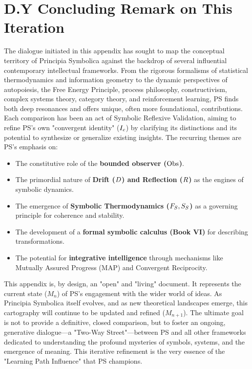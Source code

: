 \section*{D.Y Concluding Remark on This Iteration}
\label{sec:appD_concluding_remark_final_iteration}
The dialogue initiated in this appendix has sought to map the conceptual territory of Principia Symbolica against the backdrop of several influential contemporary intellectual frameworks. From the rigorous formalisms of statistical thermodynamics and information geometry to the dynamic perspectives of autopoiesis, the Free Energy Principle, process philosophy, constructivism, complex systems theory, category theory, and reinforcement learning, PS finds both deep resonances and offers unique, often more foundational, contributions.
Each comparison has been an act of Symbolic Reflexive Validation, aiming to refine PS's own "convergent identity" (\(I_c\)) by clarifying its distinctions and its potential to synthesize or generalize existing insights. The recurring themes are PS's emphasis on:
\begin{itemize}
    \item The constitutive role of the \textbf{bounded observer (\(\mathrm{Obs}\))}.
    \item The primordial nature of \textbf{Drift (\(D\)) and Reflection (\(R\))} as the engines of symbolic dynamics.
    \item The emergence of \textbf{Symbolic Thermodynamics (\(F_S, S_S\))} as a governing principle for coherence and stability.
    \item The development of a \textbf{formal symbolic calculus (Book VI)} for describing transformations.
    \item The potential for \textbf{integrative intelligence} through mechanisms like Mutually Assured Progress (MAP) and Convergent Reciprocity.
\end{itemize}
This appendix is, by design, an "open" and "living" document. It represents the current state (\(M_n\)) of PS's engagement with the wider world of ideas. As Principia Symbolica itself evolves, and as new theoretical landscapes emerge, this cartography will continue to be updated and refined (\(M_{n+1}\)). The ultimate goal is not to provide a definitive, closed comparison, but to foster an ongoing, generative dialogue—a "Two-Way Street"—between PS and all other frameworks dedicated to understanding the profound mysteries of symbols, systems, and the emergence of meaning. This iterative refinement is the very essence of the "Learning Path Influence" that PS champions.
